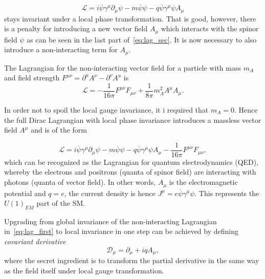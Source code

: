 \begin{equation}
	\mathcal{L} = i\overline{\psi}\gamma^{\mu}\partial_{\mu}\psi - m\overline{\psi}\psi - q\overline{\psi}\gamma^{\mu}\psi A_{\mu}
\label{eq:lag_sec}
\end{equation}
stays invariant under a local phase transformation. That is good, however, there is a penalty for introducing a new vector field $A_{\mu}$ which interacts with the spinor field $\psi$ as can be seen in the last part of~\autoref{eq:lag_sec}. It is now necessary to also introduce a non-interacting term for $A_{\mu}$.

The Lagrangian for the non-interacting vector field for a particle with mass $m_{A}$ and field strength $F^{\mu\nu}=\partial^{u}A^{\nu} - \partial^{\nu}A^{u}$ is
\begin{equation}
\mathcal{L}= -\frac{1}{16\pi} F^{\mu\nu}F_{\mu\nu} + \frac{1}{8\pi}m_{A}^{2}A^{\mu}A_{\mu}.
\end{equation}

In order not to spoil the local gauge invariance, it i required that $m_{A}=0$. Hence the full Dirac Lagrangian with local phase invariance introduces a massless vector field $A^{\mu}$ and is of the form

\begin{equation}
	\mathcal{L} = i\overline{\psi}\gamma^{\mu}\partial_{\mu}\psi - m\overline{\psi}\psi - q\overline{\psi}\gamma^{\mu}\psi A_{\mu} -\frac{1}{16\pi} F^{\mu\nu}F_{\mu\nu},
\label{eq:lag_thir}
\end{equation}
which can be recognized as the Lagrangian for quantum electrodynamics (\gls{QED}), whereby the electrons and positrons (quanta of spinor field) are interacting with photons (quanta of vector field). In other words, $A_{\mu}$ is the electromagnetic potential and $q=e$, the current density is hence $J^{\mu}=e\overline{\psi}\gamma^{\mu}\psi$. This represents the $U(1)_{EM}$ part of the SM.

Upgrading from global invariance of the non-interacting Lagrangian in~\autoref{eq:lag_first} to local invariance in one step can be achieved by defining \textit{covariant derivative}
\begin{equation}
	\mathcal{D}_{\mu} = \partial_{\mu}+ iqA_{\mu},
\end{equation}
where the secret ingredient is to transform the partial derivative in the same way as the field itself under local gauge transformation.

